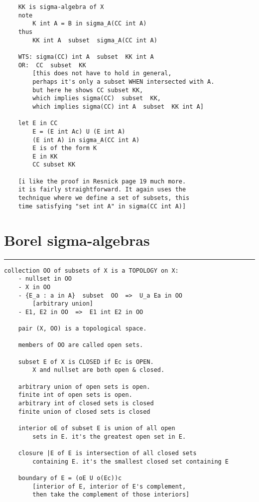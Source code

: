 \documentclass{article}
\begin{document}
\begin{flushleft}
\begin{verbatim}
    KK is sigma-algebra of X
    note 
        K int A = B in sigma_A(CC int A)
    thus 
        KK int A  subset  sigma_A(CC int A)

    WTS: sigma(CC) int A  subset  KK int A 
    OR:  CC  subset  KK 
        [this does not have to hold in general, 
        perhaps it's only a subset WHEN intersected with A.
        but here he shows CC subset KK,
        which implies sigma(CC)  subset  KK, 
        which implies sigma(CC) int A  subset  KK int A]

    let E in CC 
        E = (E int Ac) U (E int A)
        (E int A) in sigma_A(CC int A)
        E is of the form K
        E in KK 
        CC subset KK
    
    [i like the proof in Resnick page 19 much more.
    it is fairly straightforward. It again uses the 
    technique where we define a set of subsets, this 
    time satisfying "set int A" in sigma(CC int A)]
\end{verbatim}

\section*{Borel sigma-algebras}
\bigbreak
\hrule
\bigbreak

\begin{verbatim}
collection OO of subsets of X is a TOPOLOGY on X:
    - nullset in OO 
    - X in OO 
    - {E_a : a in A}  subset  OO  =>  U_a Ea in OO 
        [arbitrary union]
    - E1, E2 in OO  =>  E1 int E2 in OO

    pair (X, OO) is a topological space. 
    
    members of OO are called open sets. 

    subset E of X is CLOSED if Ec is OPEN. 
        X and nullset are both open & closed. 

    arbitrary union of open sets is open. 
    finite int of open sets is open.
    arbitrary int of closed sets is closed  
    finite union of closed sets is closed 

    interior oE of subset E is union of all open 
        sets in E. it's the greatest open set in E.

    closure |E of E is intersection of all closed sets 
        containing E. it's the smallest closed set containing E

    boundary of E = (oE U o(Ec))c
        [interior of E, interior of E's complement, 
        then take the complement of those interiors]


\end{verbatim}
\end{flushleft}
\end{document}
